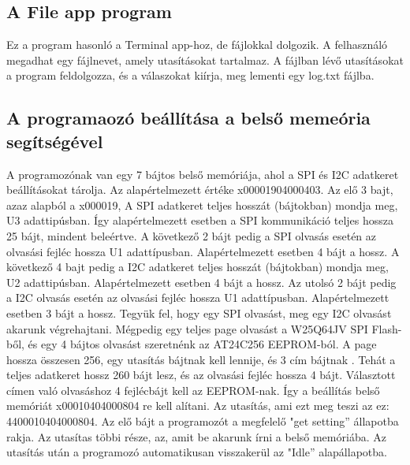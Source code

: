 \documentclass[a4paper,12pt,oneside]{book}
\begin{document}
\subsection{A File app program}
Ez a program hasonló a Terminal app-hoz, de fájlokkal dolgozik. A felhasználó megadhat egy fájlnevet, amely utasításokat tartalmaz. A fájlban lévő utasításokat a program feldolgozza, és a válaszokat kiírja, meg lementi egy log.txt fájlba.
\subsection{A programaozó beállítása a belső memeória segítségével}
A programozónak van egy 7 bájtos belső memóriája, ahol a SPI és I2C adatkeret beállításokat tárolja. Az alapértelmezett értéke x00001904000403. 
Az elő 3 bajt, azaz alapból a x000019, A SPI adatkeret teljes hosszát (bájtokban) mondja meg, U3 adattipúsban. Így alapértelmezett esetben a SPI kommunikáció teljes hossza 25 bájt, mindent beleértve. 
A következő 2 bájt pedig a SPI olvasás esetén az olvasási fejléc hossza U1 adattípusban. Alapértelmezett esetben 4 bájt a hossz. 
A következő 4 bajt pedig a I2C adatkeret teljes hosszát (bájtokban) mondja meg, U2 adattipúsban. Alapértelmezett esetben 4 bájt a hossz.
Az utolsó 2 bájt pedig a I2C olvasás esetén az olvasási fejléc hossza U1 adattípusban. Alapértelmezett esetben 3 bájt a hossz.
Tegyük fel, hogy egy SPI olvasást, meg egy I2C olvasást akarunk végrehajtani. Mégpedig egy teljes page olvasást a W25Q64JV SPI Flash-ből, és egy 4 bájtos olvasást szeretnénk az AT24C256 EEPROM-ból. A page hossza összesen 256, egy utasítás bájtnak kell lennije, és 3 cím bájtnak \cite{FLASH}. Tehát a teljes adatkeret hossz 260 bájt lesz, és az olvasási fejléc hossza 4 bájt\cite{EEPROM}. Választott címen való olvasáshoz 4 fejlécbájt kell az EEPROM-nak. Így a beállítás belső memóriát x00010404000804 re kell alítani.
Az utasítás, ami ezt meg teszi az ez: 4400010404000804.
Az elő bájt a programozót a megfelelő "get setting” állapotba rakja. Az utasítas többi része, az, amit be akarunk írni a belső memóriába. Az utasítás után a programozó automatikusan visszakerül az "Idle” alapállapotba.
\end{document}
